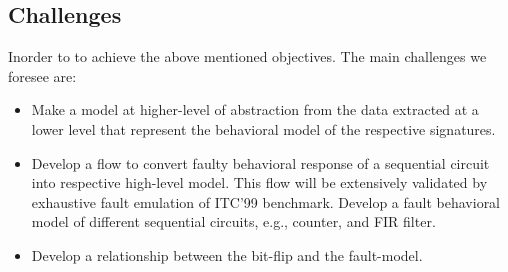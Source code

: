 \begin{itemize}
%
%
%
%
%





\end{itemize}




\subsection{Challenges}
Inorder to to achieve the above mentioned objectives. The main challenges we foresee are:
\begin{itemize}

\item Make a model at higher-level of abstraction from the data extracted at a lower level that represent the behavioral model of the respective signatures.
\item Develop a flow to convert faulty behavioral response of a sequential circuit into respective high-level model. This flow will be extensively validated by exhaustive fault emulation of ITC'99 benchmark. Develop a  fault behavioral model of different sequential circuits, e.g., counter, and FIR filter.

\item Develop a relationship between the bit-flip and the fault-model.

\end{itemize}



